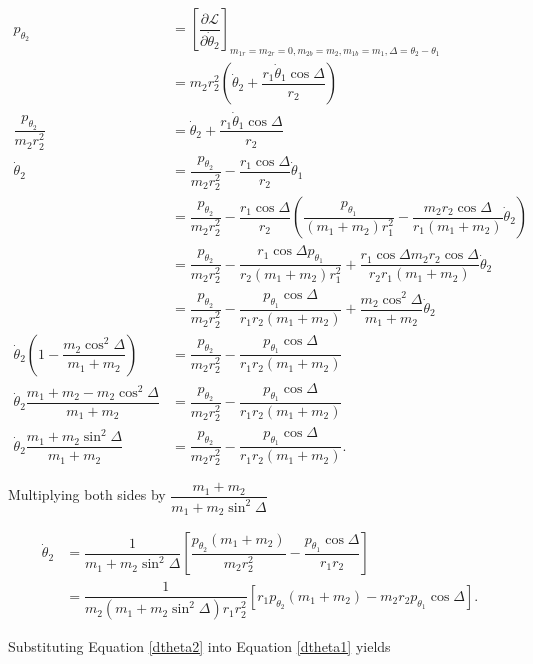 \documentclass[12pt,a4paper,portrait]{article}
\newcommand{\eq}[1]{Equation \eqref{#1}}
\newcommand{\lag}{\mathcal{L}}
\begin{document}
	
	\begin{align*}
		p_{\theta_2} &= \left[\dfrac{\partial \lag}{\partial \dot{\theta}_2}\right]_{m_{1r} = m_{2r} = 0, m_{2b} = m_2, m_{1b}=m_1, \Delta = \theta_2-\theta_1}\\
		&= m_2r_2^2\left(\dot{\theta}_2 + \dfrac{r_1\dot{\theta}_1\cos{\Delta}}{r_2}\right) \\
		\dfrac{p_{\theta_2}}{m_2r_2^2} &= \dot{\theta}_2 + \dfrac{r_1\dot{\theta}_1\cos{\Delta}}{r_2} \\
		\dot{\theta}_2 &= \dfrac{p_{\theta_2}}{m_2r_2^2} - \dfrac{r_1\cos{\Delta}}{r_2}\dot{\theta}_1\\
		&= \dfrac{p_{\theta_2}}{m_2r_2^2} - \dfrac{r_1\cos{\Delta}}{r_2}\left(\dfrac{p_{\theta_1}}{(m_1+m_2)r_1^2} - \dfrac{m_2r_2\cos{\Delta}}{r_1(m_1+m_2)}\dot{\theta}_2\right) \\
		&= \dfrac{p_{\theta_2}}{m_2r_2^2} - \dfrac{r_1 \cos{\Delta}p_{\theta_1}}{r_2(m_1+m_2)r_1^2} + \dfrac{r_1\cos{\Delta}m_2r_2\cos{\Delta}}{r_2r_1(m_1+m_2)}\dot{\theta}_2 \\
		&= \dfrac{p_{\theta_2}}{m_2r_2^2} - \dfrac{ p_{\theta_1}\cos{\Delta}}{r_1r_2(m_1+m_2)} + \dfrac{m_2\cos^2{\Delta}}{m_1+m_2}\dot{\theta}_2\\
		\dot{\theta}_2\left(1-\dfrac{m_2\cos^2{\Delta}}{m_1+m_2}\right) &= \dfrac{p_{\theta_2}}{m_2r_2^2} - \dfrac{ p_{\theta_1}\cos{\Delta}}{r_1r_2(m_1+m_2)} \\
		\dot{\theta}_2 \dfrac{m_1+m_2-m_2\cos^2{\Delta}}{m_1+m_2} &= \dfrac{p_{\theta_2}}{m_2r_2^2} - \dfrac{ p_{\theta_1}\cos{\Delta}}{r_1r_2(m_1+m_2)}\\
		\dot{\theta}_2 \dfrac{m_1+m_2\sin^2{\Delta}}{m_1+m_2} &= \dfrac{p_{\theta_2}}{m_2r_2^2} - \dfrac{ p_{\theta_1}\cos{\Delta}}{r_1r_2(m_1+m_2)}.
	\end{align*}
	
	Multiplying both sides by $\dfrac{m_1+m_2}{m_1+m_2\sin^2{\Delta}}$
	
	\begin{align}
		\dot{\theta}_2 &= \dfrac{1}{m_1+m_2\sin^2{\Delta}} \left[\dfrac{p_{\theta_2}(m_1+m_2)}{m_2r_2^2} - \dfrac{ p_{\theta_1}\cos{\Delta}}{r_1r_2}\right]\nonumber\\
		&=  \dfrac{1}{m_2(m_1+m_2\sin^2{\Delta})r_1r_2^2} \left[r_1 p_{\theta_2}(m_1+m_2) - m_2r_2p_{\theta_1}\cos{\Delta}\right]. \label{dtheta2}
	\end{align}
	
	Substituting \eq{dtheta2} into \eq{dtheta1} yields
	
\end{document}
